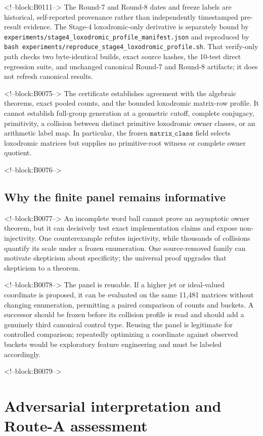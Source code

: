 \documentclass[11pt,a4paper]{article}
\theoremstyle{definition}
\theoremstyle{remark}
\begin{document}
<!--block:B0111-->
The Round-7 and Round-8 dates and freeze labels are historical, self-reported provenance rather than independently timestamped pre-result evidence. The Stage-4 loxodromic-only derivative is separately bound by \texttt{experiments/stage4\_loxodromic\_profile\_manifest.json} and reproduced by \texttt{bash experiments/reproduce\_stage4\_loxodromic\_profile.sh}. That verify-only path checks two byte-identical builds, exact source hashes, the 10-test direct regression suite, and unchanged canonical Round-7 and Round-8 artifacts; it does not refresh canonical results.

<!--block:B0075-->
The certificate establishes agreement with the algebraic theorems, exact pooled counts, and the bounded loxodromic matrix-row profile. It cannot establish full-group generation at a geometric cutoff, complete conjugacy, primitivity, a collision between distinct primitive loxodromic owner classes, or an arithmetic label map. In particular, the frozen \(\texttt{matrix\_class}\) field selects loxodromic matrices but supplies no primitive-root witness or complete owner quotient.

<!--block:B0076-->
\subsection{Why the finite panel remains informative}

<!--block:B0077-->
An incomplete word ball cannot prove an asymptotic owner theorem, but it can decisively test exact implementation claims and expose non-injectivity. One counterexample refutes injectivity, while thousands of collisions quantify its scale under a frozen enumeration. One source-removed family can motivate skepticism about specificity; the universal proof upgrades that skepticism to a theorem.

<!--block:B0078-->
The panel is reusable. If a higher jet or ideal-valued coordinate is proposed, it can be evaluated on the same 11,481 matrices without changing enumeration, permitting a paired comparison of counts and buckets. A successor should be frozen before its collision profile is read and should add a genuinely third canonical control type. Reusing the panel is legitimate for controlled comparison; repeatedly optimizing a coordinate against observed buckets would be exploratory feature engineering and must be labeled accordingly.

<!--block:B0079-->
\section{Adversarial interpretation and Route-A assessment}
\end{document}
